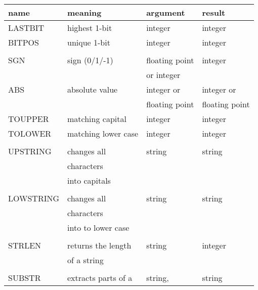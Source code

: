 \documentclass[12pt,twoside]{report}
\begin{document}
\begin{table*}[htbp]
\begin{center}\begin{tabular}{|l|l|l|l|}
\hline
name        & meaning              & argument & result \\
\hline
\hline
LASTBIT     & highest 1-bit        & integer              & integer \\
BITPOS      & unique 1-bit         & integer              & integer \\
            &                      &                      & \\
SGN         & sign (0/1/-1)        & floating point       & integer \\
            &                      & or integer           & \\
ABS         & absolute value       & integer or           & integer or \\
            &                      & floating point       & floating point \\
TOUPPER     & matching capital     & integer              & integer \\
TOLOWER     & matching lower case  & integer              & integer \\
            &                      &                      & \\
UPSTRING    & changes all          & string               & string \\
            & characters           &                      & \\
            & into capitals        &                      & \\
            &                      &                      & \\
LOWSTRING   & changes all          & string               & string \\
            & characters           &                      & \\
            & into to lower case   &                      & \\
            &                      &                      & \\
STRLEN      & returns the length   & string               & integer \\
            & of a string          &                      & \\
            &                      &                      & \\
SUBSTR      & extracts parts of a  & string,              & string \\

\end{tabular}
\end{center}
\end{table*}
\end{document}
